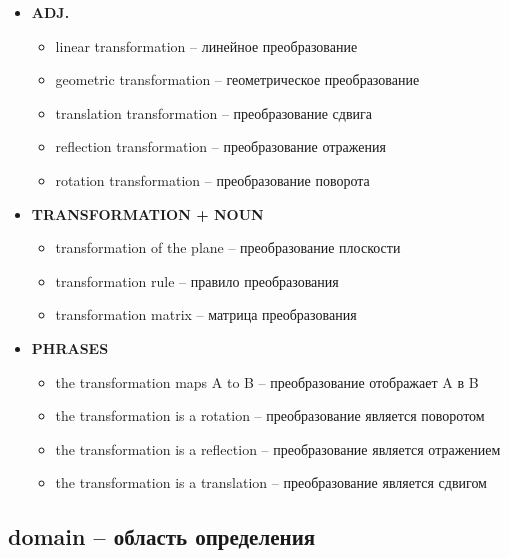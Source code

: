 \documentclass[a4paper, 10pt]{article}
\theoremstyle{definition}
\theoremstyle{plain}
\theoremstyle{remark}
\begin{document}
\begin{itemize}
    \item \textbf{ADJ.}
    \begin{itemize}
        \item linear transformation – линейное преобразование
        \item geometric transformation – геометрическое преобразование
        \item translation transformation – преобразование сдвига
        \item reflection transformation – преобразование отражения
        \item rotation transformation – преобразование поворота
    \end{itemize}
    
    \item \textbf{TRANSFORMATION + NOUN}
    \begin{itemize}
        \item transformation of the plane – преобразование плоскости
        \item transformation rule – правило преобразования
        \item transformation matrix – матрица преобразования
    \end{itemize}
    
    \item \textbf{PHRASES}
    \begin{itemize}
        \item the transformation maps A to B – преобразование отображает A в B
        \item the transformation is a rotation – преобразование является поворотом
        \item the transformation is a reflection – преобразование является отражением
        \item the transformation is a translation – преобразование является сдвигом
    \end{itemize}
\end{itemize}

\subsection{domain – область определения}
\end{document}
